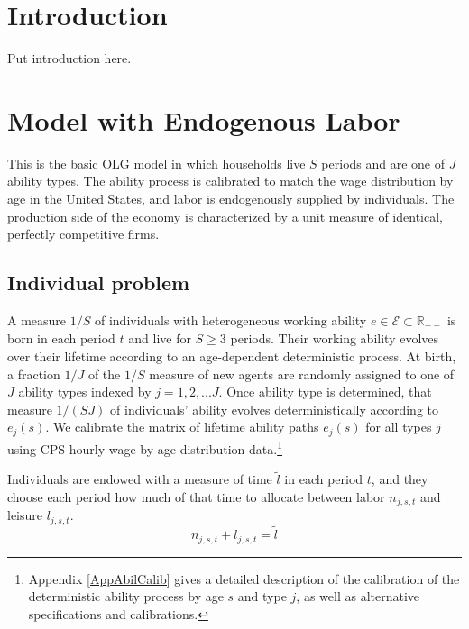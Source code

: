 \documentclass[letterpaper,12pt]{article}
\theoremstyle{definition}
\begin{document}
\begin{spacing}{1.5}

\section{Introduction}\label{SecIntro}

  Put introduction here.


\section{Model with Endogenous Labor}\label{SecModel}

  This is the basic OLG model in which households live $S$ periods and are one of $J$ ability types. The ability process is calibrated to match the wage distribution by age in the United States, and labor is endogenously supplied by individuals. The production side of the economy is characterized by a unit measure of identical, perfectly competitive firms.


  \subsection{Individual problem}\label{SecIndProb}

    A measure $1/S$ of individuals with heterogeneous working ability $e \in\mathcal{E}\subset\mathbb{R}_{++}$ is born in each period $t$ and live for $S\geq 3$ periods. Their working ability evolves over their lifetime according to an age-dependent deterministic process. At birth, a fraction $1/J$ of the $1/S$ measure of new agents are randomly assigned to one of $J$ ability types indexed by $j=1,2,...J$. Once ability type is determined, that measure $1/(SJ)$ of individuals' ability evolves deterministically according to $e_j(s)$. We calibrate the matrix of lifetime ability paths $e_j(s)$ for all types $j$ using CPS hourly wage by age distribution data.\footnote{Appendix \ref{AppAbilCalib} gives a detailed description of the calibration of the deterministic ability process by age $s$ and type $j$, as well as alternative specifications and calibrations.}

    Individuals are endowed with a measure of time $\tilde{l}$ in each period $t$, and they choose each period how much of that time to allocate between labor $n_{j,s,t}$ and leisure $l_{j,s,t}$.
    \begin{equation}\label{EqLabConstr}
      n_{j,s,t} + l_{j,s,t} = \tilde{l}
    \end{equation}


\end{spacing}
\end{document}
